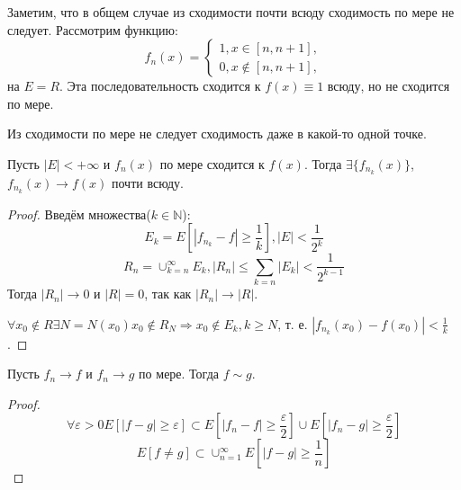 \documentclass[11pt]{article}
\newcounter{th}\setcounter{th}{0}
\def\th{\par\smallskip\refstepcounter{th}\textbf{\arabic{th}}}
\newtheorem*{Theorem}{Теорема \th}
\begin{document}
Заметим, что в общем случае из сходимости почти всюду сходимость по мере не следует. Рассмотрим
функцию:
\begin{equation}
f_n(x) = \begin{cases}
1, x \in [n, n + 1],\\
0, x \notin [n, n + 1],
\end{cases}
\end{equation}
на $E = R$. Эта последовательность сходится к $f(x) \equiv 1$ всюду, но не сходится по мере.

Из сходимости по мере не следует сходимость даже в какой-то одной точке.
\begin{Theorem}
Пусть $|E| < +\infty$ и $f_n(x)$ по мере сходится к $f(x)$. Тогда $\exists\{f_{n_k}(x)\}$,
$f_{n_k}(x) \to f(x)$ почти всюду.
\end{Theorem}
\begin{proof}
Введём множества($k \in \mathbb{N}$):
\begin{equation}
E_k = E[|f_{n_k} - f| \geq \frac1k], |E| < \frac1{2^k}
\end{equation}
\begin{equation}
R_n = \cup_{k = n}^{\infty}E_k, |R_n| \leq \sum_{k = n}|E_k| < \frac1{2^{k - 1}}
\end{equation}
Тогда $|R_n| \to 0$ и $|R| = 0$, так как $|R_n| \to |R|$.

$\forall x_0 \notin R \exists N = N(x_0) x_0 \notin R_N \Rightarrow x_0 \notin E_k, k \geq N$,
т. е. $|f_{n_k}(x_0) - f(x_0)| < \frac{1}k$.
\end{proof}
\begin{Theorem}
Пусть $f_n \to f$ и $f_n \to g$ по мере. Тогда $f \sim g$.
\end{Theorem}
\begin{proof}
\begin{equation}
\forall \varepsilon > 0 E[|f - g| \geq \varepsilon] \subset E\left[|f_n - f| \geq \frac{\varepsilon}2\right]
\cup E\left[|f_n - g| \geq \frac{\varepsilon}2\right]
\end{equation}
\begin{equation}
E[f \neq g] \subset \cup_{n = 1}^{\infty}E\left[|f - g| \geq \frac1n\right]
\end{equation}
\end{proof}
\end{document}
